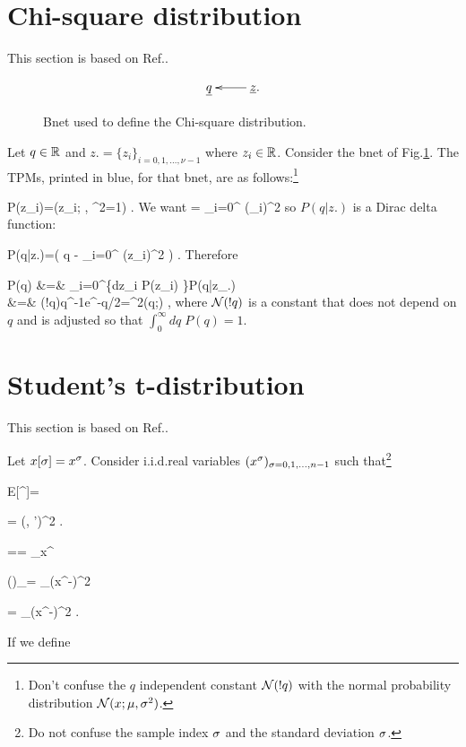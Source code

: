 \section{Chi-square distribution}
This section
is based on Ref.\cite{wiki-chi-sq}.

\begin{figure}[h!]
$$
\xymatrix{
\rvq&\rvz.\ar[l]
}
$$
\caption{Bnet 
used to define the Chi-square distribution.}
\label{fig-chi-sq}
\end{figure}

Let $q\in{ \mathbb{R}}$ and
$z.=\{z_i\}_{i=0,1, \ldots, \nu-1}$
where $z_i\in { \mathbb{R}}$.
Consider the bnet of Fig.\ref{fig-chi-sq}.
The TPMs, printed in blue,
for that bnet, are as follows:\footnote{
Don't confuse the $q$
independent constant ${\cal N}(!q)$
with the normal probability distribution
${\cal N}(x;\mu, \sigma^2)$.}




\beq
\color{blue}
P(z_i)=\caln(z_i; , \s^2=1)
\;.
\eeq
We want
\beq
\rvq = \sum_{i=0}^{} (\rvz_i)^2
\eeq
so $P(q|z.)$
is a Dirac delta function:

\beq
\color{blue}
P(q|z.)=\delta(
q - \sum_{i=0}^{} (z_i)^2
)
\;.
\eeq
Therefore

\beqa
P(q) &=& \prod_{i=0}^{}\left\{\int dz_i
\;P(z_i)
\right\}P(q|z_.)
\\
&=&
\caln(!q)q^{-1}e^{-q/2}=\chi^2(q;\nu)
\;,
\eeqa
where ${\cal N}(!q)$ is a constant that does not depend
on $q$ and is adjusted so that $\int_0^\infty dq\;P(q)=1$.

\section{Student's t-distribution}
This section
is based on Ref.\cite{wiki-stud}.

Let $x[\sigma]=x^\sigma$.
Consider i.i.d.real  variables
$(x^\sigma)_{\sigma=0,1, \ldots, n-1}$
such that\footnote{Do not confuse the sample
index $\sigma$ and the standard deviation
$\sigma$.}

\beq
E[\rvx^\s]=\mu
\eeq

\beq
{}=
\delta(\s, \s')\s^2
\;.
\eeq

\beq
\hat{\mu}==
\sum_\s x^\s
\;
\eeq

\beq
(\hatvar)_\infty=
\sum_\s (x^\s-\mu)^2
\eeq

\beq
\hatvar=
\sum_\s (x^\s-\hat{\mu})^2
\;.
\eeq

If we define

